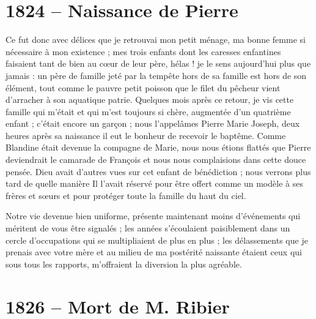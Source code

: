\documentclass[11pt,a4paper]{report}
\begin{document}
\section*{1824 -- Naissance de Pierre}

Ce fut donc avec délices que je retrouvai mon petit ménage, ma bonne femme si nécessaire à mon existence ; mes trois enfants dont les caresses enfantines faisaient tant de bien au cœur de leur père, hélas ! je le sens aujourd'hui plus que jamais : un père de famille jeté par la tempête hors de sa famille est hors de son élément, tout comme le pauvre petit poisson que le filet du pêcheur vient d'arracher à son aquatique patrie. Quelques mois après ce retour, je vis cette famille qui m'était et qui m'est toujours si chère, augmentée d'un quatrième enfant ; c'était encore un garçon ; nous l'appelâmes Pierre Marie Joseph, deux heures après sa naissance il eut le bonheur de recevoir le baptême. Comme Blandine était devenue la compagne de Marie, nous nous étions flattés que Pierre deviendrait le camarade de François et nous nous complaisions dans cette douce pensée. Dieu avait d'autres vues sur cet enfant de bénédiction ; nous verrons plus tard de quelle manière Il l'avait réservé pour être offert comme un modèle à ses frères et sœurs et pour protéger toute la famille du haut du ciel.

Notre vie devenue bien uniforme, présente maintenant moins d'événements qui méritent de vous être signalés ; les années s'écoulaient paisiblement dans un cercle d'occupations qui se multipliaient de plus en plus ; les délassements que je prenais avec votre mère et au milieu de ma postérité naissante étaient ceux qui sous tous les rapports, m'offraient la diversion la plus agréable.

\section*{1826 -- Mort de M. Ribier}
\end{document}
